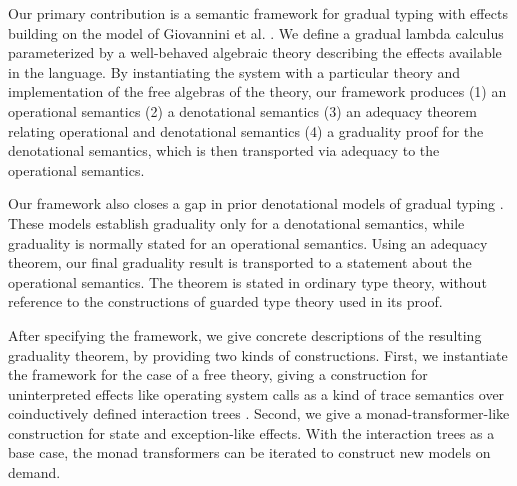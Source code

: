 \documentclass[acmsmall,screen,review,anonymous]{acmart}
\theoremstyle{remark}
\newif\ifdraft
\renewcommand{\max}[1]{\ifdraft{\color{blue}[{\bf Max says}: #1]}\fi}
\begin{document}


Our primary contribution is a semantic framework for gradual typing with effects
building on the model of Giovannini et al. \cite{gtt-sgdt}.
We define a gradual lambda calculus parameterized by a well-behaved algebraic
theory describing the effects available in the language. By instantiating the
system with a particular theory and implementation of the free algebras of the
theory, our framework produces (1) an operational semantics (2) a denotational
semantics (3) an adequacy theorem relating operational and denotational
semantics (4) a graduality proof for the denotational semantics, which is then
transported via adequacy to the operational semantics.
%

Our framework also closes a gap in prior denotational models of gradual typing
\cite{new-licata18, gtt-sgdt}. These models establish graduality only for a
denotational semantics, while graduality is normally stated for an operational
semantics. Using an adequacy theorem, our final graduality result is transported
to a statement about the operational semantics.
%
The theorem is stated in ordinary type theory, without reference to the
constructions of guarded type theory used in its proof.

After specifying the framework, we give concrete descriptions of the resulting
graduality theorem, by providing two kinds of constructions. First, we
instantiate the framework for the case of a free theory, giving a construction
for uninterpreted effects like operating system calls as a kind of trace
semantics over coinductively defined interaction trees \cite{itrees}. Second, we
give a monad-transformer-like construction for state and exception-like effects.
With the interaction trees as a base case, the monad transformers can be
iterated to construct new models on demand.
\end{document}
